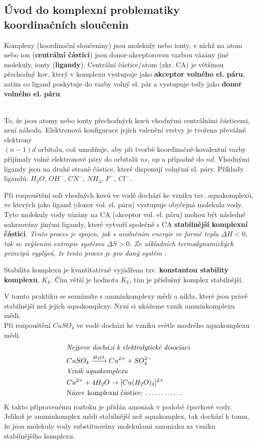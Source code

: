\documentclass[13pt, a4paper, twoside]{article}
\begin{document}
\large \onehalfspacing
\subsection*{Úvod do komplexní problematiky koordinačních sloučenin}
Komplexy (koordinační sloučeniny) jsou molekuly nebo ionty, v nichž na atom nebo ion (\textbf{centrální částici}) jsou donor-akceptorovou vazbou vázány jiné molekuly,
ionty (\textbf{ligandy}). Centrální částice/atom (zkr. CA) je většinou přechodný kov, který v komplexu vystupuje jako \textbf{akceptor volného el. páru},
zatím co ligand poskytuje do vazby volný el. pár a vystupuje tedy jako \textbf{donor volného el. páru}.

\begin{align*}
    [CA(ligandy)]
\end{align*}

To, že jsou atomy nebo ionty přechodných kovů vhodnými centrálními částicemi, není náhoda. Elektronová konfigurace jejich valenční vrstvy je tvořena převážně elektrony \\
$(n-1)d$ orbitalu, což umožňuje, aby při tvorbě koordinačně-kovalentní vazby přijímaly volné elektronové páry do orbitalů $ns$, $np$ a případně do $nd$.
Vhodnými ligandy jsou na druhé straně částice, které disponují volnými el. páry. Příklady ligandů: $H_2O$, $OH^-$, $CN^-$, $NH_3$, $F^-$, $Cl^-$.

Při rospouštění solí vhodných kovů ve vodě dochází ke vzniku tzv. aquakomplexů, ve kterých jako ligand (donor vol. el. páru) vystupuje obyčejná molekula vody.
Tyto molekuly vody vázány na CA (akceptor vol. el. páru) mohou být následně nahrzovány jinými ligandy, které vytvoří společně s CA \textbf{stabilnější komplexní částici}. 
\emph{Tento proces je spojen, jak s uvolněním energie ve formě tepla $\Delta H < 0$, tak se zvýšením entropie systému $\Delta S > 0$. Ze základních termodynamických principů
vyplývá, že tento proces je pro daný systém .}

Stabilita komplexu je kvantitativně vyjádřena tzv. \textbf{konstantou stability komplexu}, $K_k$. Čím větší je hodnota $K_k$, tím je příslušný komplex stabilnější.

V tomto praktiku se seznámíte s amminkomplexy mědi a niklu, které jsou právě stabilnější než jejich aquakomplexy. Nyní si ukážeme vznik amminkomplexu mědi.\\
Při rozpouštění $CuSO_4$ ve vodě dochází ke vzniku světle modrého aquakomplexu mědi.
\begin{align*}
    &\text{\emph{Nejprve dochází k elektrolytické disociaci}}\\
    &CuSO_4 \xrightarrow[]{H_2O} Cu^{2+} + SO_4^{2-}\\
    &\text{\emph{Vznik aquakomplexu}}\\
    &Cu^{2+} + 4H_2O \to [Cu(H_2O)_4]^{2+}\\
    &\text{Název komplexní částice: \dots\dots\dots\dots}
\end{align*}
K takto připravenému roztoku je přidán amoniak v podobě čpavkové vody. Jelikož je amminkomplex mědi stabilnější než aquakomplex, tak dochází k tomu, že
jsou molekuly vody substituovány molekulami amoniaku za vzniku stabilnějšího komplexu.
\end{document}
